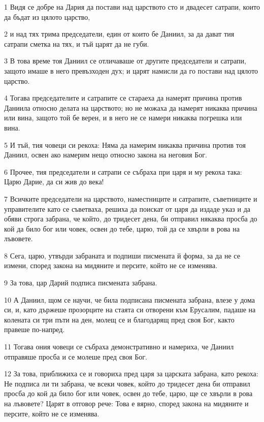 \par 1 Видя се добре на Дария да постави над царството сто и двадесет сатрапи, които да бъдат из цялото царство,
\par 2 и над тях трима председатели, един от които бе Даниил, за да дават тия сатрапи сметка на тях, и тъй царят да не губи.
\par 3 В това време тоя Даниил се отличаваше от другите председатели и сатрапи, защото имаше в него превъзходен дух; и царят намисли да го постави над цялото царство.
\par 4 Тогава председателите и сатрапите се стараеха да намерят причина против Даниила относно делата на царството; но не можаха да намерят никаква причина или вина, защото той бе верен, и в него не се намери никаква погрешка или вина.
\par 5 И тъй, тия човеци си рекоха: Няма да намерим никаква причина против тоя Даниил, освен ако намерим нещо относно закона на неговия Бог.
\par 6 Прочее, тия председатели и сатрапи се събраха при царя и му рекоха така: Царю Дарие, да си жив до века!
\par 7 Всичките председатели на царството, наместниците и сатрапите, съветниците и управителите като се съветваха, решиха да поискат от царя да издаде указ и да обяви строга забрана, че който, до тридесет дена, би отправил някаква просба до кой да било бог или човек, освен до тебе, царю, той да се хвърли в рова на лъвовете.
\par 8 Сега, царю, утвърди забраната и подпиши писмената й форма, за да не се измени, според закона на мидяните и персите, който не се изменява.
\par 9 За това, цар Дарий подписа писмената забрана.
\par 10 А Даниил, щом се научи, че била подписана писмената забрана, влезе у дома си, и, като държеше прозорците на стаята си отворени към Ерусалим, падаше на колената си три пъти на ден, молещ се и благодарящ пред своя Бог, както правеше по-напред.
\par 11 Тогава ония човеци се събраха демонстративно и намериха, че Даниил отправяше просба и се молеше пред своя Бог.
\par 12 За това, приближиха се и говориха пред царя за царската забрана, като рекоха: Не подписа ли ти забрана, че всеки човек, който до тридесет дена би отправил просба до кой да било бог или човек, освен до тебе, царю, ще се хвърли в рова на лъвовете? Царят в отговор рече: Това е вярно, според закона на мидяните и персите, който не се изменява.
